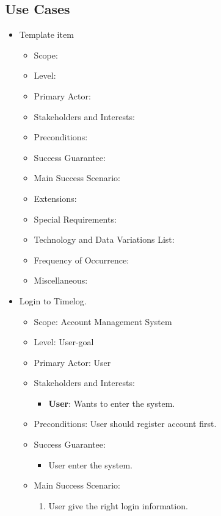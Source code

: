 \documentclass[12pt, a4paper]{article}
\begin{document}
\begin{CJK*}{UTF8}{bkai}
  \subsection{Use Cases}
    \begin{itemize}
      \item {{Template item}}
        \begin{itemize}
          \item Scope:
          \item Level:
          \item Primary Actor:
          \item Stakeholders and Interests:
          \item Preconditions:
          \item Success Guarantee:
          \item Main Success Scenario:
          \item Extensions:
          \item Special Requirements:
          \item Technology and Data Variations List:
          \item Frequency of Occurrence:
          \item Miscellaneous:
        \end{itemize}
      \item Login to Timelog.
        \begin{itemize}
          \item Scope: Account Management System
          \item Level: User-goal
          \item Primary Actor: User
          \item Stakeholders and Interests:
            \begin{itemize}
              \item {\bf User}: Wants to enter the system.
            \end{itemize}
          \item Preconditions: User should register account first.
          \item Success Guarantee:
            \begin{itemize}
              \item User enter the system.
            \end{itemize}
          \item Main Success Scenario:
            \begin{enumerate}
              \item User give the right login information.

\end{enumerate}
\end{itemize}
\end{itemize}
\end{CJK*}
\end{document}

